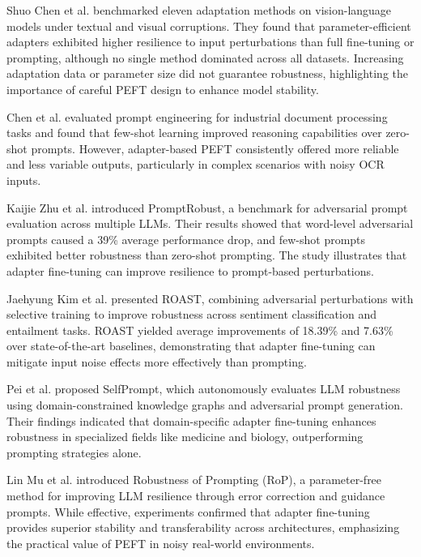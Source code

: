 \documentclass[journal,article,submit,pdftex,moreauthors]{Definitions/mdpi}
\begin{document}
Shuo Chen et al. \citep{chen2023benchmarking} benchmarked eleven adaptation methods on vision-language models under textual and visual corruptions. They found that parameter-efficient adapters exhibited higher resilience to input perturbations than full fine-tuning or prompting, although no single method dominated across all datasets. Increasing adaptation data or parameter size did not guarantee robustness, highlighting the importance of careful PEFT design to enhance model stability.

Chen et al. \citep{chen2025evaluation} evaluated prompt engineering for industrial document processing tasks and found that few-shot learning improved reasoning capabilities over zero-shot prompts. However, adapter-based PEFT consistently offered more reliable and less variable outputs, particularly in complex scenarios with noisy OCR inputs.

Kaijie Zhu et al. \citep{zhu2023promptrobust} introduced PromptRobust, a benchmark for adversarial prompt evaluation across multiple LLMs. Their results showed that word-level adversarial prompts caused a 39\% average performance drop, and few-shot prompts exhibited better robustness than zero-shot prompting. The study illustrates that adapter fine-tuning can improve resilience to prompt-based perturbations.

Jaehyung Kim et al. \citep{kim2023roast} presented ROAST, combining adversarial perturbations with selective training to improve robustness across sentiment classification and entailment tasks. ROAST yielded average improvements of 18.39\% and 7.63\% over state-of-the-art baselines, demonstrating that adapter fine-tuning can mitigate input noise effects more effectively than prompting.

Pei et al. \citep{pei2025selfprompt} proposed SelfPrompt, which autonomously evaluates LLM robustness using domain-constrained knowledge graphs and adversarial prompt generation. Their findings indicated that domain-specific adapter fine-tuning enhances robustness in specialized fields like medicine and biology, outperforming prompting strategies alone.

Lin Mu et al. \citep{mu2025robustness} introduced Robustness of Prompting (RoP), a parameter-free method for improving LLM resilience through error correction and guidance prompts. While effective, experiments confirmed that adapter fine-tuning provides superior stability and transferability across architectures, emphasizing the practical value of PEFT in noisy real-world environments.
\end{document}
